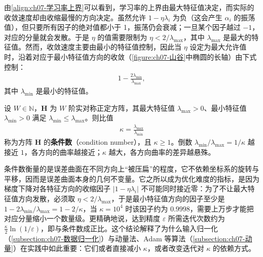 \documentclass[../../main.tex]{subfiles}
\begin{document}
由\eqref{align:ch07-学习率上界}可以看到，学习率的上界由最大特征值决定，而实际的收敛速度却由收缩最慢的方向决定。虽然允许 $1-\eta\lambda_i$ 为负（这会产生 $\alpha_i$ 的振荡值），但只要所有因子的绝对值都小于 1，振荡仍会衰减；一旦某个因子越过 $-1$，对应的分量就会发散。于是 $\eta$ 的值需要限制为 $\eta<2/\lambda_{\max}$，其中 $\lambda_{\max}$ 是最大的特征值。然而，收敛速度主要由最小的特征值控制，因此当 $\eta$ 设定为最大允许值时，沿着对应于最小特征值方向的收敛（\cref{figure:ch07-山谷}中椭圆的长轴）由下式控制：
\begin{align}
1-\frac{2\lambda_{\min}}{\lambda_{\max}},
\label{align:ch07-最慢因子}
\end{align}
其中 $\lambda_{\min}$ 是最小的特征值。

\begin{definition}[条件数]\label{definition:ch07-条件数}
设 $W\in\mathbb{N}$，$\mathbf{H}$ 为 $W$ 阶实对称正定方阵，其最大特征值 $\lambda_{\max}>0$、最小特征值 $\lambda_{\min}>0$ 满足 $\lambda_{\min}\leqslant\lambda_{\max}$。则比值
\begin{align}
\kappa = \frac{\lambda_{\max}}{\lambda_{\min}}
\label{align:ch07-条件数}
\end{align}
称为方阵 $\mathbf{H}$ 的\textbf{条件数}（condition number），且 $\kappa\geqslant1$。倒数 $\lambda_{\min}/\lambda_{\max}=1/\kappa$ 越接近 $1$，各方向的曲率越接近；$\kappa$ 越大，各方向曲率的差异越悬殊。
\end{definition}

\begin{remark}
条件数衡量的是误差曲面在不同方向上“被压扁”的程度，它不依赖坐标系的旋转与平移，因而是误差曲面本身的几何不变量。它之所以成为优化难度的指标，是因为梯度下降对各特征方向的收缩因子 $|1-\eta\lambda_i|$ 不可能同时接近零：为了不让最大特征值方向发散，必须取 $\eta<2/\lambda_{\max}$，于是最小特征值方向的因子至少是 $1-2\lambda_{\min}/\lambda_{\max}=1-2/\kappa$，当 $\kappa=10^{4}$ 时该因子约为 $0.9998$，需要上万步才能把对应分量缩小一个数量级。更精确地说，达到精度 $\varepsilon$ 所需迭代次数约为 $\frac{\kappa}{2}\ln(1/\varepsilon)$，即与条件数成正比。这个结论解释了为什么输入归一化（\cref{subsection:ch07-数据归一化}）与动量法、Adam 等算法（\cref{subsection:ch07-动量}）在实践中如此重要：它们或者直接减小 $\kappa$，或者改变迭代对 $\kappa$ 的依赖方式。
\end{remark}
\end{document}
